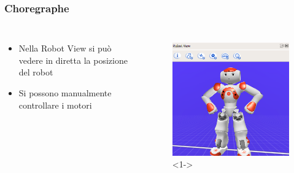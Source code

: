 \documentclass[aspectratio=169]{beamer}
\begin{document}
\begin{frame}
\frametitle{Choregraphe}
\begin{columns}
		\begin{itemize}
			\item<1-> Nella Robot View si può vedere in diretta la posizione del robot
			\item<2-> Si possono manualmente controllare i motori
		\end{itemize}
		\begin{figure}[ht]
		\begin{center}
		\includegraphics[width=.7\textwidth]{view}<1->
		\end{center}
		\end{figure}
\end{columns}
\end{frame}
\end{document}
